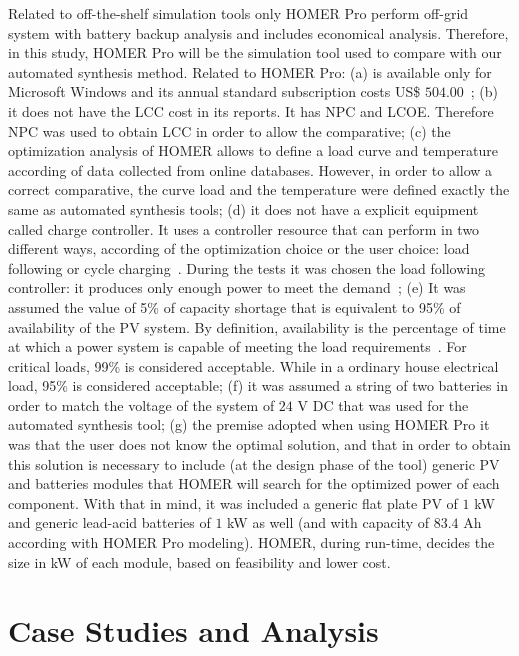\documentclass[journal]{IEEEtran}
\begin{document}
Related to off-the-shelf simulation tools only HOMER Pro perform off-grid system with battery backup analysis and includes economical analysis. Therefore, in this study, HOMER Pro will be the simulation tool used to compare with our automated synthesis method.  Related to HOMER Pro: (a) is available only for Microsoft Windows and its annual standard subscription costs US\$ $504.00$~\cite{HOMER}; (b) it does not have the LCC cost in its reports. It has NPC and LCOE. Therefore NPC was used to obtain LCC in order to allow the comparative; (c) the optimization analysis of HOMER allows to define a load curve and temperature according of data collected from online databases. However, in order to allow a correct comparative, the curve load and the temperature were defined exactly the same as automated synthesis tools; (d) it does not have a explicit equipment called charge controller. It uses a controller resource that can perform in two different ways, according of the optimization choice or the user choice: load following or cycle charging~\cite{HOMER}. During the tests it was chosen the load following controller: it produces only enough power to meet the demand~\cite{HOMER}; (e) It was assumed the value of 5\% of capacity shortage that is equivalent to 95\% of availability of the PV system. By definition, availability is the percentage of time at which a power system is capable of meeting the load requirements~\cite{Khatib2014}. For critical loads, 99\% is considered acceptable. While in a ordinary house electrical load, 95\% is considered acceptable; (f) it was assumed a string of two batteries in order to match the voltage of the system of $24$ V DC that was used for the automated synthesis tool; (g) the premise adopted when using HOMER Pro it was that the user does not know the optimal solution, and that in order to obtain this solution is necessary to include (at the design phase of the tool) generic PV and batteries modules that HOMER will search for the optimized power of each component. With that in mind, it was included a generic flat plate PV of $1$ kW and generic lead-acid batteries of $1$ kW as well (and with capacity of $83.4$ Ah according with HOMER Pro modeling). HOMER, during run-time, decides the size in kW of each module, based on feasibility and lower cost.


\section{Case Studies and Analysis}
\label{sec:Results}
\end{document}
